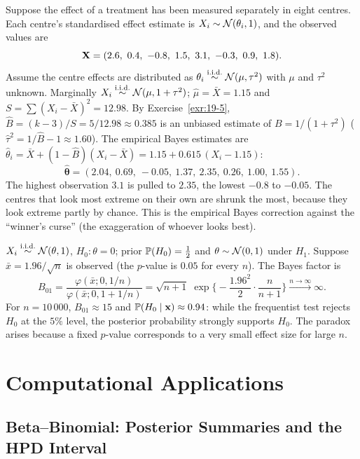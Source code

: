 \documentclass[main.tex]{subfiles}
\begin{document}
\begin{example}\label{ex:sekiz-merkez}
Suppose the effect of a treatment has been measured separately in eight centres. Each centre's standardised effect estimate is $X_i\sim\Normal(\theta_i,1)$, and the observed values are
\[
\X=(2.6,\ 0.4,\ -0.8,\ 1.5,\ 3.1,\ -0.3,\ 0.9,\ 1.8).
\]
Assume the centre effects are distributed as $\theta_i\iid\Normal(\mu,\tau^2)$ with $\mu$ and $\tau^2$ unknown. Marginally $X_i\iid\Normal(\mu,1+\tau^2)$; $\hat\mu=\bar X=1.15$ and $S=\sum(X_i-\bar X)^2=12.98$. By Exercise~\ref{exr:19-5}, $\hat B=(k-3)/S=5/12.98\approx0.385$ is an unbiased estimate of $B=1/(1+\tau^2)$ ($\hat\tau^2=1/\hat B-1\approx1.60$). The empirical Bayes estimates are $\hat\theta_i=\bar X+(1-\hat B)(X_i-\bar X)=1.15+0.615\,(X_i-1.15)$:
\[
\hat{\bm\theta}=(2.04,\ 0.69,\ -0.05,\ 1.37,\ 2.35,\ 0.26,\ 1.00,\ 1.55).
\]
The highest observation $3.1$ is pulled to $2.35$, the lowest $-0.8$ to $-0.05$. The centres that look most extreme on their own are shrunk the most, because they look extreme partly by chance. This is the empirical Bayes correction against the ``winner's curse'' (the exaggeration of whoever looks best).
\end{example}

\begin{example}
$X_i\iid\Normal(\theta,1)$, $H_0:\theta=0$; prior $\P(H_0)=\frac12$ and $\theta\sim\Normal(0,1)$ under $H_1$. Suppose $\bar x=1.96/\sqrt n$ is observed (the $p$-value is $0.05$ for every $n$). The Bayes factor is
\[
B_{01}=\frac{\varphi(\bar x;0,1/n)}{\varphi(\bar x;0,1+1/n)}=\sqrt{n+1}\;\exp\Big\{-\frac{1.96^2}{2}\cdot\frac{n}{n+1}\Big\}\xrightarrow{n\to\infty}\infty .
\]
For $n=10\,000$, $B_{01}\approx15$ and $\P(H_0\mid\x)\approx0.94$: while the frequentist test rejects $H_0$ at the $5\%$ level, the posterior probability strongly supports $H_0$. The paradox arises because a fixed $p$-value corresponds to a very small effect size for large $n$.
\end{example}

\section{Computational Applications}

\subsection{Beta--Binomial: Posterior Summaries and the HPD Interval}
\end{document}
